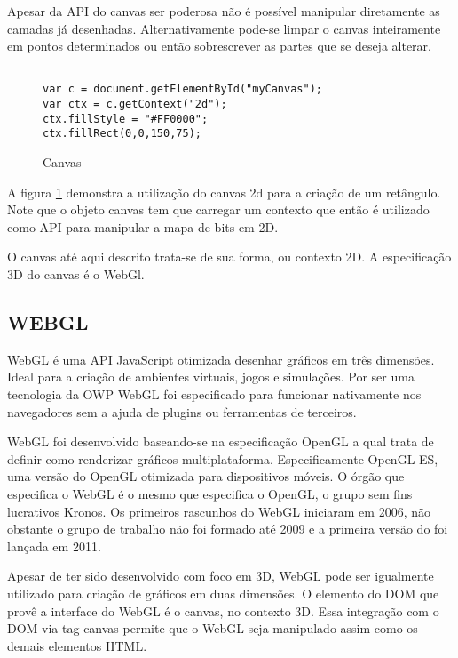 Apesar da API do canvas ser poderosa não é possível manipular
diretamente as camadas já desenhadas. Alternativamente pode-se limpar
o canvas inteiramente em pontos determinados ou então sobrescrever as
partes que se deseja alterar.

\begin{figure}[H]
\centering
\begin{verbatim}

var c = document.getElementById("myCanvas");
var ctx = c.getContext("2d");
ctx.fillStyle = "#FF0000";
ctx.fillRect(0,0,150,75);

\end{verbatim}
\caption{Canvas}
\label{img:retangleOnCanvas}
\end{figure}

A figura \ref{img:retangleOnCanvas} demonstra a utilização do canvas 2d
para a criação de um retângulo. Note que o objeto canvas tem que carregar um
contexto que então é utilizado como API para manipular a mapa de bits em 2D.

O canvas até aqui descrito trata-se de sua forma, ou contexto 2D. A
especificação 3D do canvas é o WebGl.

\subsection{WEBGL}

WebGL é uma API JavaScript otimizada desenhar gráficos em três
dimensões. Ideal para a criação de ambientes virtuais, jogos e
simulações. Por ser uma tecnologia da OWP WebGL foi especificado
para funcionar nativamente nos navegadores sem a ajuda de plugins ou
ferramentas de terceiros.

WebGL foi desenvolvido baseando-se na especificação OpenGL a
qual trata de definir como renderizar gráficos multiplataforma.
Especificamente OpenGL ES, uma versão do OpenGL otimizada para
dispositivos móveis. O órgão que especifica o WebGL é o mesmo que
especifica o OpenGL, o grupo sem fins lucrativos Kronos. Os primeiros
rascunhos do WebGL iniciaram em 2006, não obstante o grupo de trabalho
não foi formado até 2009 e a primeira versão do foi lançada em 2011.

Apesar de ter sido desenvolvido com foco em 3D, WebGL pode ser
igualmente utilizado para criação de gráficos em duas
dimensões\autocite[pp. 6]{3daps}. O elemento do DOM que provê a
interface do WebGL é o canvas, no contexto 3D. Essa integração com
o DOM via tag canvas permite que o WebGL seja manipulado assim como os
demais elementos HTML.

